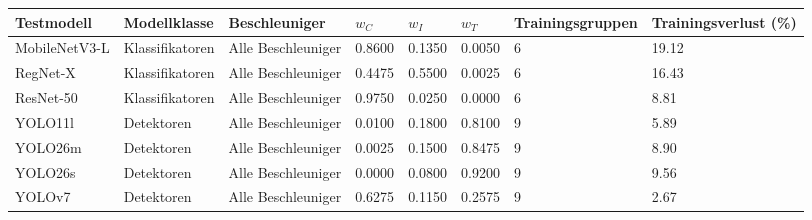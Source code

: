 \begin{tabular}{@{}llllllll@{}}
\toprule
Testmodell & Modellklasse & Beschleuniger & $w_C$ & $w_I$ & $w_T$ & Trainingsgruppen & Trainingsverlust (\%) \\
\midrule
MobileNetV3-L & Klassifikatoren & Alle Beschleuniger & 0.8600 & 0.1350 & 0.0050 & 6 & 19.12 \\
RegNet-X & Klassifikatoren & Alle Beschleuniger & 0.4475 & 0.5500 & 0.0025 & 6 & 16.43 \\
ResNet-50 & Klassifikatoren & Alle Beschleuniger & 0.9750 & 0.0250 & 0.0000 & 6 & 8.81 \\
YOLO11l & Detektoren & Alle Beschleuniger & 0.0100 & 0.1800 & 0.8100 & 9 & 5.89 \\
YOLO26m & Detektoren & Alle Beschleuniger & 0.0025 & 0.1500 & 0.8475 & 9 & 8.90 \\
YOLO26s & Detektoren & Alle Beschleuniger & 0.0000 & 0.0800 & 0.9200 & 9 & 9.56 \\
YOLOv7 & Detektoren & Alle Beschleuniger & 0.6275 & 0.1150 & 0.2575 & 9 & 2.67 \\
\bottomrule
\end{tabular}
